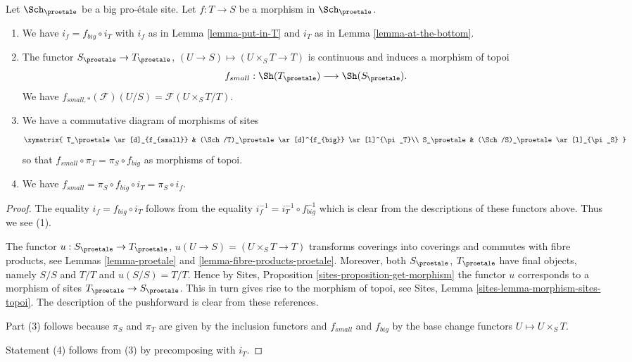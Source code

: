 \begin{lemma}
\label{lemma-morphism-big-small}
Let $\Sch_\proetale$ be a big pro-\'etale site.
Let $f : T \to S$ be a morphism in $\Sch_\proetale$.
\begin{enumerate}
\item We have $i_f = f_{big} \circ i_T$ with $i_f$ as in
Lemma \ref{lemma-put-in-T} and $i_T$ as in
Lemma \ref{lemma-at-the-bottom}.
\item The functor $S_\proetale \to T_\proetale$,
$(U \to S) \mapsto (U \times_S T \to T)$ is continuous and induces
a morphism of topoi
$$
f_{small} : \Sh(T_\proetale) \longrightarrow \Sh(S_\proetale).
$$
We have $f_{small, *}(\mathcal{F})(U/S) = \mathcal{F}(U \times_S T/T)$.
\item We have a commutative diagram of morphisms of sites
$$
\xymatrix{
T_\proetale \ar[d]_{f_{small}} &
(\Sch/T)_\proetale \ar[d]^{f_{big}} \ar[l]^{\pi_T}\\
S_\proetale &
(\Sch/S)_\proetale \ar[l]_{\pi_S}
}
$$
so that $f_{small} \circ \pi_T = \pi_S \circ f_{big}$ as morphisms of topoi.
\item We have $f_{small} = \pi_S \circ f_{big} \circ i_T = \pi_S \circ i_f$.
\end{enumerate}
\end{lemma}

\begin{proof}
The equality $i_f = f_{big} \circ i_T$ follows from the
equality $i_f^{-1} = i_T^{-1} \circ f_{big}^{-1}$ which is
clear from the descriptions of these functors above.
Thus we see (1).

\medskip\noindent
The functor $u : S_\proetale \to T_\proetale$,
$u(U \to S) = (U \times_S T \to T)$
transforms coverings into coverings and commutes with fibre products,
see Lemmas \ref{lemma-proetale} and \ref{lemma-fibre-products-proetale}.
Moreover, both $S_\proetale$, $T_\proetale$ have final objects,
namely $S/S$ and $T/T$ and $u(S/S) = T/T$. Hence by
Sites, Proposition \ref{sites-proposition-get-morphism}
the functor $u$ corresponds to a morphism of sites
$T_\proetale \to S_\proetale$. This in turn gives rise to the
morphism of topoi, see
Sites, Lemma \ref{sites-lemma-morphism-sites-topoi}. The description
of the pushforward is clear from these references.

\medskip\noindent
Part (3) follows because $\pi_S$ and $\pi_T$ are given by the
inclusion functors and $f_{small}$ and $f_{big}$ by the
base change functors $U \mapsto U \times_S T$.

\medskip\noindent
Statement (4) follows from (3) by precomposing with $i_T$.
\end{proof}

